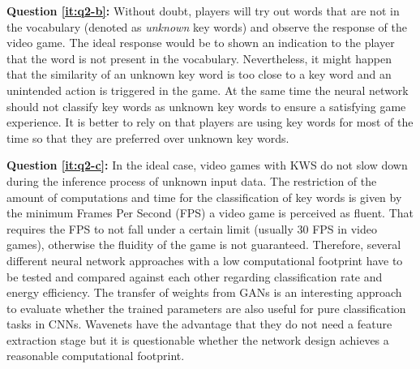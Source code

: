 \textbf{Question \ref{it:q2-b}:} 
Without doubt, players will try out words that are not in the vocabulary (denoted as \emph{unknown} key words) and observe the response of the video game.
The ideal response would be to shown an indication to the player that the word is not present in the vocabulary. 
Nevertheless, it might happen that the similarity of an unknown key word is too close to a key word and an unintended action is triggered in the game. 
At the same time the neural network should not classify key words as unknown key words to ensure a satisfying game experience.
It is better to rely on that players are using key words for most of the time so that they are preferred over unknown key words.

\textbf{Question \ref{it:q2-c}:}
In the ideal case, video games with KWS do not slow down during the inference process of unknown input data.
The restriction of the amount of computations and time for the classification of key words is given by the minimum Frames Per Second (FPS) a video game is perceived as fluent.
That requires the FPS to not fall under a certain limit (usually 30 FPS in video games), otherwise the fluidity of the game is not guaranteed.
Therefore, several different neural network approaches with a low computational footprint have to be tested and compared against each other regarding classification rate and energy efficiency.
The transfer of weights from GANs is an interesting approach to evaluate whether the trained parameters are also useful for pure classification tasks in CNNs.
Wavenets have the advantage that they do not need a feature extraction stage but it is questionable whether the network design achieves a reasonable computational footprint.



